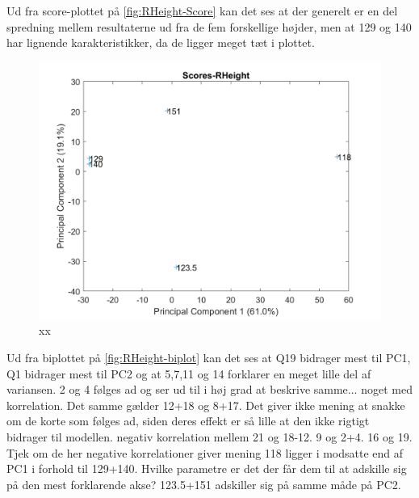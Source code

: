 Ud fra score-plottet på \autoref{fig:RHeight-Score} kan det ses at der generelt er en del spredning mellem resultaterne ud fra de fem forskellige højder, men at 129 og 140 har lignende karakteristikker, da de ligger meget tæt i plottet.

\begin{figure}[H]
\centering
\includegraphics[width=\textwidth]{Figure/DatabehandlingSkalaer/PCAfigures/RHeight-Scores}
\caption{xx}
\label{fig:RHeight-Score}
\end{figure}
Ud fra biplottet på \autoref{fig:RHeight-biplot} kan det ses at Q19 bidrager mest til PC1, Q1 bidrager mest til PC2 og at 5,7,11 og 14 forklarer en meget lille del af variansen. 2 og 4 følges ad og ser ud til i høj grad at beskrive samme... noget med korrelation. Det samme gælder 12+18 og 8+17. Det giver ikke mening at snakke om de korte som følges ad, siden deres effekt er så lille at den ikke rigtigt bidrager til modellen. 
negativ korrelation mellem 21 og 18-12. 9 og 2+4. 16 og 19. Tjek om de her negative korrelationer giver mening
118 ligger i modsatte end af PC1 i forhold til 129+140. Hvilke parametre er det der får dem til at adskille sig på den mest forklarende akse? 123.5+151 adskiller sig på samme måde på PC2.


